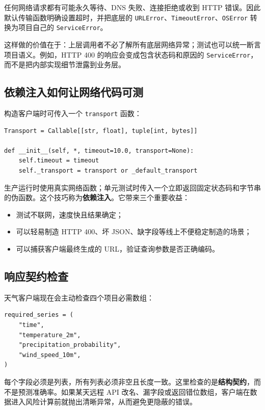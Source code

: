 \documentclass[UTF8,zihao=-4,a4paper]{ctexart}
\newcommand{\term}[1]{\textbf{#1}}
\newcommand{\code}[1]{\texttt{#1}}
\begin{document}
任何网络请求都有可能永久等待、DNS 失败、连接拒绝或收到 HTTP 错误。因此默认传输函数明确设置超时，并把底层的 \code{URLError}、\code{TimeoutError}、\code{OSError} 转换为项目自己的 \code{ServiceError}。

这样做的价值在于：上层调用者不必了解所有底层网络异常；测试也可以统一断言项目语义。例如，HTTP 400 的响应会变成包含状态码和原因的 \code{ServiceError}，而不是把内部实现细节泄露到业务层。

\subsection{依赖注入如何让网络代码可测}

构造客户端时可传入一个 \code{transport} 函数：

\begin{lstlisting}[style=pythonstyle]
Transport = Callable[[str, float], tuple[int, bytes]]

def __init__(self, *, timeout=10.0, transport=None):
    self.timeout = timeout
    self._transport = transport or _default_transport
\end{lstlisting}

生产运行时使用真实网络函数；单元测试时传入一个立即返回固定状态码和字节串的伪函数。这个技巧称为\term{依赖注入}。它带来三个重要收益：

\begin{itemize}
  \item 测试不联网，速度快且结果确定；
  \item 可以轻易制造 HTTP 400、坏 JSON、缺字段等线上不便稳定制造的场景；
  \item 可以捕获客户端最终生成的 URL，验证查询参数是否正确编码。
\end{itemize}

\subsection{响应契约检查}

天气客户端现在会主动检查四个项目必需数组：

\begin{lstlisting}[style=pythonstyle]
required_series = (
    "time",
    "temperature_2m",
    "precipitation_probability",
    "wind_speed_10m",
)
\end{lstlisting}

每个字段必须是列表，所有列表必须非空且长度一致。这里检查的是\term{结构契约}，而不是预测准确率。如果某天远程 API 改名、漏字段或返回错位数组，客户端在数据进入风险计算前就抛出清晰异常，从而避免更隐蔽的错误。
\end{document}
